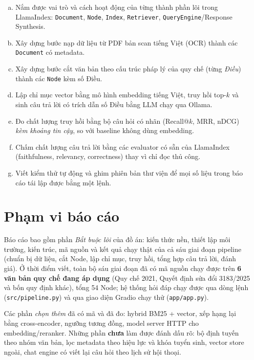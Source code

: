 \begin{enumerate}[(a)]
  \item Nắm được vai trò và cách hoạt động của từng thành phần lõi trong LlamaIndex: \texttt{Document}, \texttt{Node}, \texttt{Index}, \texttt{Retriever}, \texttt{QueryEngine}/Response Synthesis.
  \item Xây dựng bước nạp dữ liệu từ PDF bản scan tiếng Việt (OCR) thành các \texttt{Document} có metadata.
  \item Xây dựng bước cắt văn bản theo cấu trúc pháp lý của quy chế (từng \emph{Điều}) thành các \texttt{Node} kèm số Điều.
  \item Lập chỉ mục vector bằng mô hình embedding tiếng Việt, truy hồi top-$k$ và sinh câu trả lời có trích dẫn số Điều bằng LLM chạy qua Ollama.
  \item Đo chất lượng truy hồi bằng bộ câu hỏi có nhãn (Recall@$k$, MRR, nDCG) \emph{kèm khoảng tin cậy}, so với baseline không dùng embedding.
  \item Chấm chất lượng câu trả lời bằng các evaluator có sẵn của LlamaIndex (faithfulness, relevancy, correctness) thay vì chỉ đọc thủ công.
  \item Viết kiểm thử tự động và ghim phiên bản thư viện để mọi số liệu trong báo cáo tái lập được bằng một lệnh.
\end{enumerate}

\section{Phạm vi báo cáo}

Báo cáo bao gồm phần \emph{Bắt buộc lõi} của đồ án: kiến thức nền, thiết lập môi trường, kiến trúc, mã nguồn và kết quả chạy thật của cả sáu giai đoạn pipeline (chuẩn bị dữ liệu, cắt Node, lập chỉ mục, truy hồi, tổng hợp câu trả lời, đánh giá). Ở thời điểm viết, toàn bộ sáu giai đoạn đã có mã nguồn chạy được trên \textbf{6 văn bản quy chế đang áp dụng} (Quy chế 2021, Quyết định sửa đổi 3183/2025 và bốn quy định khác), tổng 54 Node; hệ thống hỏi đáp chạy được qua dòng lệnh (\texttt{src/pipeline.py}) và qua giao diện Gradio chạy thử (\texttt{app/app.py}).

Các phần \emph{chọn thêm} đã có mã và đã đo: hybrid BM25 + vector, xếp hạng lại bằng cross-encoder, ngưỡng tương đồng, model server HTTP cho embedding/reranker. Những phần \textbf{chưa} làm được đánh dấu rõ: bộ định tuyến theo nhóm văn bản, lọc metadata theo hiệu lực và khóa tuyển sinh, vector store ngoài, chat engine có viết lại câu hỏi theo lịch sử hội thoại.

